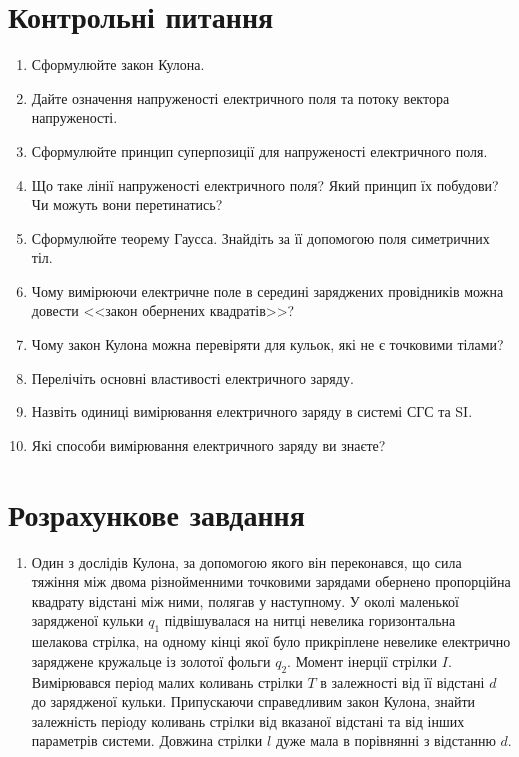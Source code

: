 \section*{Контрольні питання}

\begin{enumerate}
	\item Сформулюйте закон Кулона.
    \item Дайте означення напруженості електричного поля та потоку вектора напруженості.
    \item Сформулюйте принцип суперпозиції для напруженості електричного поля.
    \item Що таке лінії напруженості електричного поля? Який принцип їх побудови? Чи можуть вони перетинатись?
    \item Сформулюйте теорему Гаусса. Знайдіть за її допомогою поля симетричних тіл.
    \item Чому вимірюючи електричне поле в середині заряджених провідників можна довести <<закон обернених квадратів>>?
    \item Чому закон Кулона можна перевіряти для кульок, які не є точковими тілами?
    \item Перелічіть основні властивості електричного заряду.
    \item Назвіть одиниці вимірювання електричного заряду в системі СГС та SI.
    \item Які способи вимірювання електричного заряду ви знаєте?
\end{enumerate}

\section*{Розрахункове завдання}

\begin{enumerate}
\item Один з дослідів Кулона, за допомогою якого він переконався, що сила тяжіння між двома різнойменними
точковими зарядами обернено пропорційна квадрату відстані між ними, полягав у наступному. У околі маленької зарядженої кульки $q_1$ підвішувалася на нитці невелика горизонтальна шелакова стрілка, на одному кінці якої було прикріплене невелике електрично заряджене кружальце із золотої фольги $q_2$. Момент інерції стрілки $I$. Вимірювався період малих коливань стрілки $T$ в залежності від її відстані $d$ до зарядженої кульки. Припускаючи справедливим закон Кулона, знайти залежність періоду коливань стрілки від вказаної відстані та від інших параметрів системи. Довжина стрілки $l$ дуже мала в порівнянні з відстанню $d$.
\end{enumerate}


